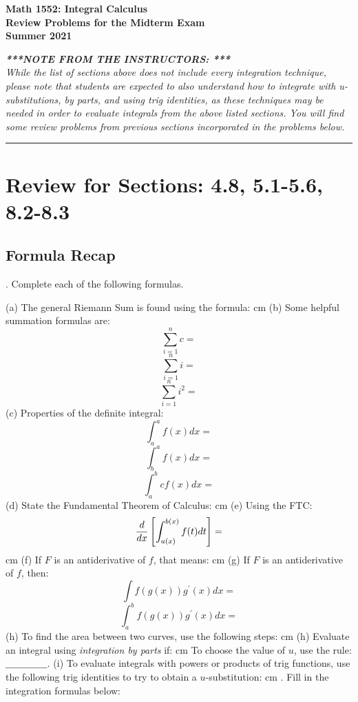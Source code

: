 \documentclass[12pt]{article}
\begin{document}
\vskip 1in
\begin{center}
     {\LARGE{\bf Math 1552: Integral Calculus \\[0.2ex] 
                Review Problems for the Midterm Exam \\[1ex] 
                Summer 2021
     }}
\end{center} 
     
     \bigskip 
     \noindent
     \emph{\textbf{***NOTE FROM THE INSTRUCTORS: ***} \\ 
           While the list of sections above does 
           not include every integration technique, please note that students are expected 
           to also understand how to integrate with u-substitutions, by parts, and using 
           trig identities, as these techniques may be needed in order to evaluate 
           integrals from the above listed sections.  You will find some review problems 
           from previous sections incorporated in the problems below.}

\vskip 0.2in

\bigskip\hrule\bigskip

\section{Review for Sections: 4.8, 5.1-5.6, 8.2-8.3} 

\subsection*{Formula Recap}

. Complete each of the following formulas.

\noindent (a) The general Riemann Sum is found using the formula:
 cm
\noindent (b) Some helpful summation formulas are:
$$\sum_{i=1}^n c =$$
$$\sum_{i=1}^n i = $$
$$\sum_{i=1}^n i^2 = $$
\medskip
\noindent (c) Properties of the definite integral:
$$\int_a^a f(x) dx = $$
$$\int_b^a f(x) dx = $$
$$\int_a^b c f(x) dx = $$
\medskip
\noindent (d) State the Fundamental Theorem of Calculus:
 cm
\noindent (e) Using the FTC:
$${{d}\over{dx}} \left [ \int_{a(x)}^{b(x)} f(t) dt \right ] = $$
 cm
\noindent (f) If $F$ is an antiderivative of $f$, that means:
 cm
\noindent (g) If $F$ is an antiderivative of $f$, then:
$$\int f(g(x)) g^{\prime}(x) dx = $$
\medskip
$$\int_a^b f(g(x)) g^{\prime}(x) dx = $$
\medskip
\noindent (h) To find the area between two curves, use the following 
steps:
 cm
\noindent (h) Evaluate an integral using {\it integration by 
parts\/} if:
 cm
\noindent To choose the value of $u$, use the rule:
$\_\_\_\_\_\_\_\_\_\_\_\_\_$.
\bigskip
\noindent (i) To evaluate integrals with powers or products of trig 
functions, use the following trig identities to try to obtain a 
$u$-substitution: 
 cm
. Fill in the integration formulas below:
\end{document}
